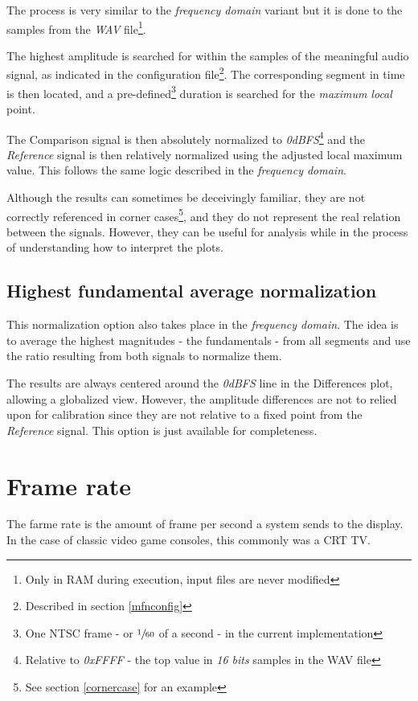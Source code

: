 \documentclass[10pt,a4paper]{report}
\begin{document}
\begin{appendices}
The process is very similar to the \textit{frequency domain} variant but it is done to the samples from the  \textit{WAV} file\footnote{Only in RAM during execution, input files are never modified}.

The highest amplitude is searched for within the samples of the meaningful audio signal, as indicated in the configuration file\footnote{Described in section \ref{mfnconfig}}. The corresponding segment in time is then located, and a pre-defined\footnote{One NTSC frame - or $\sfrac{1}{60}$ of a second - in the current implementation} duration is searched for the \textit{maximum local} point.

The Comparison signal is then absolutely normalized to \textit{0dBFS}\footnote{Relative to \textit{0xFFFF} - the top value in \textit{16 bits} samples in the WAV file} and the \textit{Reference} signal is then relatively normalized using the adjusted local maximum value. This follows the same logic described in the \textit{frequency domain}.

Although the results can sometimes be deceivingly familiar, they are not correctly referenced in corner cases\footnote{See section \ref{cornercase} for an example}, and they do not represent the real relation between the signals. However, they can be useful for analysis while in the process of understanding how to interpret the plots.

\section{Highest fundamental average normalization}

This normalization option also takes place in the \textit{frequency domain}. The idea is to average the highest magnitudes - the fundamentals - from all segments and use the ratio resulting from both signals to normalize them.

The results are always centered around the \textit{0dBFS} line in the Differences plot, allowing a globalized view. However, the amplitude differences are not to relied upon for calibration since they are not relative to a fixed point from the \textit{Reference} signal. This option is just available for completeness.

\chapter{Frame rate}
\label{framerate}

The farme rate is the amount of frame per second a system sends to the display. In the case of classic video game consoles, this commonly was a CRT TV.


\end{appendices}
\end{document}
